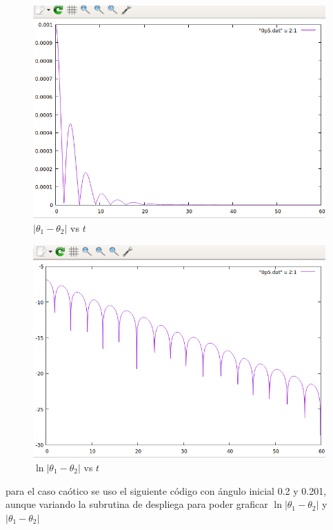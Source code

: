 \documentclass[12pt,a4paper]{article}
\begin{document}
\begin{figure}
    \centering
    \includegraphics[scale=0.7]{0p5abs.PNG}
    \caption{$|\theta_1-\theta_2|$ vs $t$}
\end{figure}

\begin{figure}
    \centering
    \includegraphics[scale=0.7]{0p5logabs.PNG}
    \caption{$\ln{|\theta_1-\theta_2|}$ vs $t$}
\end{figure}

para el caso caótico se uso el siguiente código con ángulo inicial 0.2 y 0.201,  aunque variando la subrutina de despliega para poder graficar $\ln{|\theta_1-\theta_2|}$ y $|\theta_1 - \theta_2|$
\end{document}
